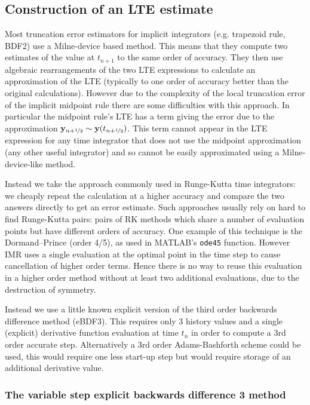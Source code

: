 \subsection{Construction of an LTE estimate}

Most truncation error estimators for implicit integrators (e.g. trapezoid rule, BDF2) use a Milne-device based method.\cite[pgs 707-716]{Gresho-Sani}
This means that they compute two estimates of the value at $t_{n+1}$ to the same order of accuracy.
They then use algebraic rearrangements of the two LTE expressions to calculate an approximation of the LTE (typically to one order of accuracy better than the original calculations).
However due to the complexity of the local truncation error of the implicit midpoint rule there are some difficulties with this approach.
In particular the midpoint rule's LTE has a term giving the error due to the approximation $\mathbf{y}_{n+\nicefrac{1}{2}} \sim \mathbf{y}(t_{n+\nicefrac{1}{2}})$.
This term cannot appear in the LTE expression for any time integrator that does not use the midpoint approximation (\ie any other useful integrator) and so cannot be easily approximated using a Milne-device-like method.

Instead we take the approach commonly used in Runge-Kutta time integrators: we cheaply repeat the calculation at a higher accuracy and compare the two answers directly to get an error estimate.
Such approaches usually rely on hard to find Runge-Kutta pairs: pairs of RK methods which share a number of evaluation points but have different orders of accuracy.
One example of this technique is the Dormand–Prince (order 4/5), as used in MATLAB's \texttt{ode45} function.
However IMR uses a single evaluation at the optimal point in the time step to cause cancellation of higher order terms.
Hence there is no way to reuse this evaluation in a higher order method without at least two additional evaluations, due to the destruction of symmetry.

Instead we use a little known explicit version of the third order backwards difference method (eBDF3).
This requires only 3 history values and a single (explicit) derivative function evaluation at time $t_n$ in order to compute a 3rd order accurate step.
Alternatively a 3rd order Adams-Bashforth scheme could be used, this would require one less start-up step but would require storage of an additional derivative value.

\subsubsection{The variable step explicit backwards difference 3 method}

